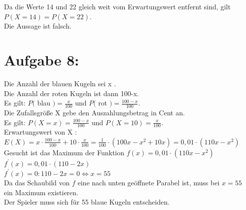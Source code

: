 \documentclass[10pt]{article}
\begin{document}
Da die Werte 14 und 22 gleich weit vom Erwartungswert entfernt sind, gilt $P(X=14)=P(X=22)$.\\
Die Aussage ist falsch.

\section*{Aufgabe 8:}
Die Anzahl der blauen Kugeln sei x .\\
Die Anzahl der roten Kugeln ist dann 100-x.\\
Es gilt: $P($ blau $)=\frac{x}{100}$ und $P($ rot $)=\frac{100-x}{100}$.\\
Die Zufallsgröße X gebe den Auszahlungsbetrag in Cent an.\\
Es gilt: $P(X=x)=\frac{100-x}{100}$ und $P(X=10)=\frac{x}{100}$.\\
Erwartungswert von X :\\
$E(X)=x \cdot \frac{100-x}{100}+10 \cdot \frac{x}{100}=\frac{1}{100} \cdot\left(100 x-x^{2}+10 x\right)=0,01 \cdot\left(110 x-x^{2}\right)$\\
Gesucht ist das Maximum der Funktion $f(x)=0,01 \cdot\left(110 x-x^{2}\right)$\\
$f^{\prime}(x)=0,01 \cdot(110-2 x)$\\
$f^{\prime}(x)=0: 110-2 x=0 \Leftrightarrow x=55$\\
Da das Schaubild von $f$ eine nach unten geöffnete Parabel ist, muss bei $x=55$ ein Maximum existieren.\\
Der Spieler muss sich für 55 blaue Kugeln entscheiden.
\end{document}
